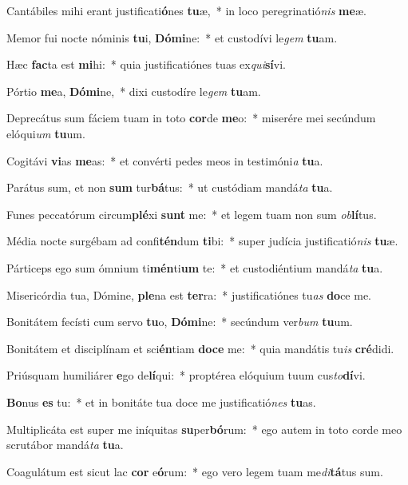 \item Cantábiles mihi erant justificati\textbf{ó}nes \textbf{tu}æ,~* in loco peregrinatió\textit{nis} \textbf{me}æ.
\item Memor fui nocte nóminis \textbf{tu}i, \textbf{Dó}\textbf{mi}ne:~* et custodívi le\textit{gem} \textbf{tu}am.
\item Hæc \textbf{fac}ta est \textbf{mi}hi:~* quia justificatiónes tuas ex\textit{qui}\textbf{sí}vi.
\item Pórtio \textbf{me}a, \textbf{Dó}\textbf{mi}ne,~* dixi custodíre le\textit{gem} \textbf{tu}am.
\item Deprecátus sum fáciem tuam in toto \textbf{cor}de \textbf{me}o:~* miserére mei secúndum elóqui\textit{um} \textbf{tu}um.
\item Cogitávi \textbf{vi}as \textbf{me}as:~* et convérti pedes meos in testimóni\textit{a} \textbf{tu}a.
\item Parátus sum, et non \textbf{sum} tur\textbf{bá}tus:~* ut custódiam mandá\textit{ta} \textbf{tu}a.
\item Funes peccatórum circum\textbf{plé}xi \textbf{sunt} me:~* et legem tuam non sum \textit{ob}\textbf{lí}tus.
\item Média nocte surgébam ad confi\textbf{tén}dum \textbf{ti}bi:~* super judícia justificatió\textit{nis} \textbf{tu}æ.
\item Párticeps ego sum ómnium ti\textbf{mén}ti\textbf{um} te:~* et custodiéntium mandá\textit{ta} \textbf{tu}a.
\item Misericórdia tua, Dómine, \textbf{ple}na est \textbf{ter}ra:~* justificatiónes tu\textit{as} \textbf{do}ce me.
\item Bonitátem fecísti cum servo \textbf{tu}o, \textbf{Dó}\textbf{mi}ne:~* secúndum ver\textit{bum} \textbf{tu}um.
\item Bonitátem et disciplínam et sci\textbf{én}tiam \textbf{do}\textbf{ce} me:~* quia mandátis tu\textit{is} \textbf{cré}didi.
\item Priúsquam humiliárer \textbf{e}go de\textbf{lí}qui:~* proptérea elóquium tuum cus\textit{to}\textbf{dí}vi.
\item \textbf{Bo}nus \textbf{es} tu:~* et in bonitáte tua doce me justificatió\textit{nes} \textbf{tu}as.
\item Multiplicáta est super me iníquitas \textbf{su}per\textbf{bó}rum:~* ego autem in toto corde meo scrutábor mandá\textit{ta} \textbf{tu}a.
\item Coagulátum est sicut lac \textbf{cor} e\textbf{ó}rum:~* ego vero legem tuam me\textit{di}\textbf{tá}tus sum.
